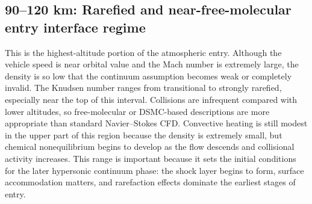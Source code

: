 \documentclass{article}
\begin{document}
\subsection*{90--120 km: Rarefied and near-free-molecular entry interface regime}
This is the highest-altitude portion of the atmospheric entry. Although the vehicle speed is near orbital value and the Mach number is extremely large, the density is so low that the continuum assumption becomes weak or completely invalid. The Knudsen number ranges from transitional to strongly rarefied, especially near the top of this interval. Collisions are infrequent compared with lower altitudes, so free-molecular or DSMC-based descriptions are more appropriate than standard Navier--Stokes CFD. Convective heating is still modest in the upper part of this region because the density is extremely small, but chemical nonequilibrium begins to develop as the flow descends and collisional activity increases. This range is important because it sets the initial conditions for the later hypersonic continuum phase: the shock layer begins to form, surface accommodation matters, and rarefaction effects dominate the earliest stages of entry.
\end{document}
